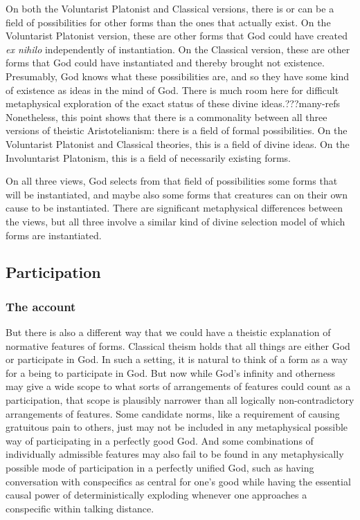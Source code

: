 On both the Voluntarist Platonist and Classical versions, there is or can be a field of possibilities for other forms than 
the ones that actually exist. On the Voluntarist Platonist version, these are other forms that God could have created
\textit{ex nihilo} independently of instantiation.  On the Classical version, these are other forms that God could have 
instantiated and thereby brought not existence. Presumably, God knows what these possibilities are, and so they have some 
kind of existence as ideas in the mind of God. There is much room here for difficult metaphysical exploration of the 
exact status of these divine ideas.???many-refs Nonetheless, this point shows that there is a commonality between all three
versions of theistic Aristotelianism: there is a field of formal possibilities. On the Voluntarist Platonist and Classical
theories, this is a field of divine ideas. On the Involuntarist Platonism, this is a field of necessarily existing forms.

On all three views, God selects from that field of possibilities some forms that will be instantiated, and maybe also some 
forms that creatures can on their own cause to be instantiated. There are significant metaphysical differences between the
views, but all three involve a similar kind of divine selection model of which forms are instantiated.

\subsection{Participation}
\subsubsection{The account}
But there is also a different way that we could have a theistic explanation of normative features of forms. Classical theism
holds that all things are either God or participate in God. In such a setting, it is natural to think of a form as a way for 
a being to participate in God. But now while God's infinity and otherness may give a wide scope to what sorts of
arrangements of features could count as a participation, that scope is plausibly narrower than all logically non-contradictory
arrangements of features. Some candidate norms, like a requirement of causing gratuitous pain to others, just may not be included 
in any metaphysical possible way of participating in a perfectly good God. And some combinations of individually admissible features may also 
fail to be found in any metaphysically possible mode of participation in a perfectly unified God, such as having conversation with 
conspecifics as central for one's good while having the essential causal power of deterministically exploding whenever one approaches a 
conspecific within talking distance. 

